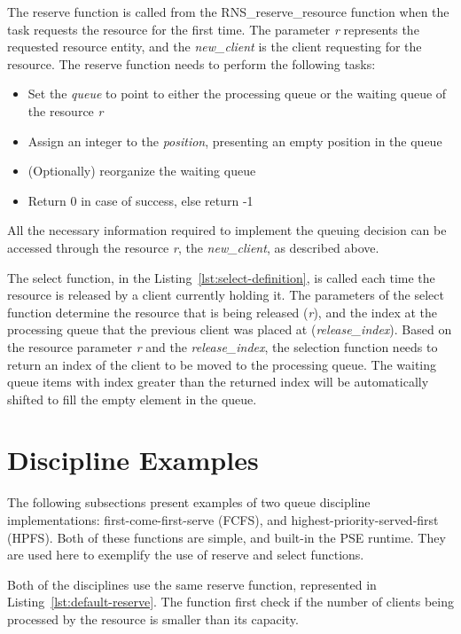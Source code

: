 The reserve function is called from the RNS\_reserve\_resource function when the task requests  the resource for the first time. The parameter \emph{r} represents the requested resource entity, and the \emph{new\_client} is the client requesting for the resource. The reserve function needs to perform the following tasks:

\begin{itemize}
\item Set the \emph{queue} to point to either the processing queue or the waiting queue of the resource \emph{r}
\item Assign an integer to the \emph{position}, presenting an empty position in the queue
\item (Optionally) reorganize the waiting queue
\item Return 0 in case of success, else return -1
\end{itemize}

All the necessary information required to implement the queuing decision can be accessed through the resource \emph{r}, the \emph{new\_client}, as described above.

The select function, in the Listing~\ref{lst:select-definition}, is called each time the resource is released by a client currently holding it. The parameters of the select function determine the resource that is being released (\emph{r}), and the index at the processing queue that the previous client was placed at (\emph{release\_index}). Based on the resource parameter \emph{r} and the \emph{release\_index}, the selection function needs to return an index of the client to be moved to the processing queue. The waiting queue items with index greater than the returned index will be automatically shifted to fill the empty element in the queue.



\section{Discipline Examples}
The following subsections present examples of two queue discipline implementations: first-come-first-serve (FCFS), and highest-priority-served-first (HPFS). Both of these functions are simple, and built-in the PSE runtime. They are used here to exemplify  the use of reserve and select functions.

Both of the disciplines use the same reserve function, represented in Listing~\ref{lst:default-reserve}. The function first check if the number of clients being processed by the resource is smaller than its capacity.

